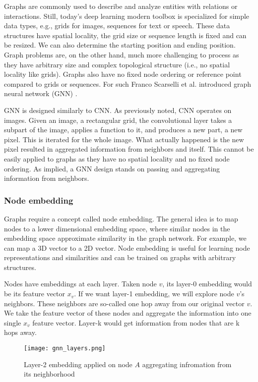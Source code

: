 Graphs are commonly used to describe and analyze entities with relations or interactions. Still, today's deep learning modern toolbox is specialized for simple data types, e.g., grids for images, sequences for text or speech. These data structures have spatial locality, the grid size or sequence length is fixed and can be resized. We can also determine the starting position and ending position. Graph problems are, on the other hand, much more challenging to process as they have arbitrary size and complex topological structure (i.e., no spatial locality like grids). Graphs also have no fixed node ordering or reference point compared to grids or sequences. For such Franco Scarselli et al. introduced graph neural network (GNN) \cite{graph}.

GNN is designed similarly to CNN. As previously noted, CNN operates on images. Given an image, a rectangular grid, the convolutional layer takes a subpart of the image, applies a function to it, and produces a new part, a new pixel. This is iterated for the whole image. What actually happened is the new pixel resulted in aggregated information from neighbors and itself. This cannot be easily applied to graphs as they have no spatial locality and no fixed node ordering. As implied, a GNN design stands on passing and aggregating information from neighbors. 

\subsubsection{Node embedding}

Graphs require a concept called node embedding. The general idea is to map nodes to a lower dimensional embedding space, where similar nodes in the embedding space approximate similarity in the graph network. For example, we can map a 3D vector to a 2D vector. Node embedding is useful for learning node representations and similarities and can be trained on graphs with arbitrary structures.

Nodes have embeddings at each layer. Taken node $v$, its layer-0 embedding would be its feature vector $x_v$. If we want layer-1 embedding, we will explore node $v$'s neighbors. These neighbors are so-called one hop away from our original vector $v$. We take the feature vector of these nodes and aggregate the information into one single $x_v$ feature vector. Layer-k would get information from nodes that are k hops away. 

\begin{figure}[h]
  \centering
  \texttt{[image: gnn\_layers.png]}
  \caption{Layer-2 embedding applied on node $A$ aggregating infromation from its neighborhood \cite{stanford}}
  \label{fig:gnn_layers}
\end{figure}

